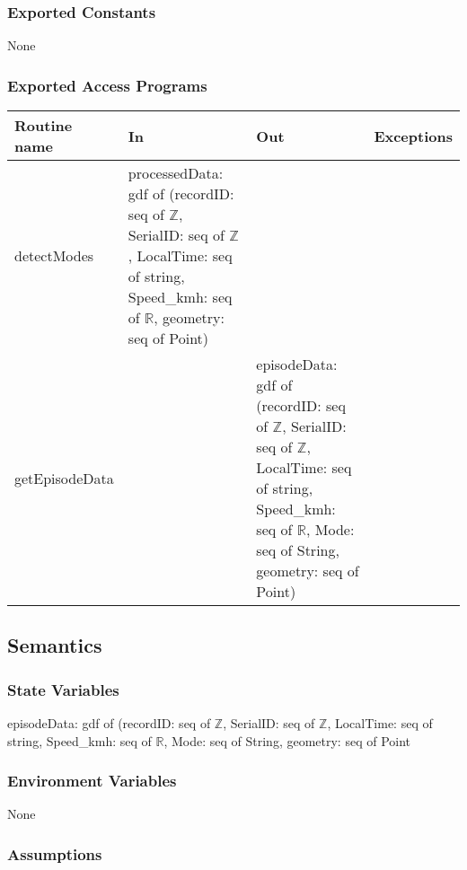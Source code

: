 \documentclass[12pt, titlepage]{article}
\begin{document}
\subsubsection{Exported Constants}

None

\subsubsection{Exported Access Programs}

\begin{center}
\begin{tabular}{| l | >{\raggedright}p{4cm} | >{\raggedright}p{4cm} | l |}%
\hline
\textbf{Routine name} & \textbf{In} & \textbf{Out} & \textbf{Exceptions}\\
\hline
detectModes & processedData: gdf of (recordID: seq of $\mathbb{Z}$, SerialID: seq of $\mathbb{Z}$, LocalTime: seq of string, Speed\_kmh: seq of $\mathbb{R}$, geometry: seq of Point) & & \\
\hline
getEpisodeData & & episodeData: gdf of (recordID: seq of $\mathbb{Z}$, SerialID: seq of $\mathbb{Z}$, LocalTime: seq of string, Speed\_kmh: seq of $\mathbb{R}$, Mode: seq of String, geometry: seq of Point) & \\
\hline

\end{tabular}
\end{center}

\subsection{Semantics}

\subsubsection{State Variables}

episodeData: gdf of (recordID: seq of $\mathbb{Z}$, SerialID: seq of $\mathbb{Z}$, LocalTime: seq of string, Speed\_kmh: seq of $\mathbb{R}$, Mode: seq of String, geometry: seq of Point

\subsubsection{Environment Variables}

None

\subsubsection{Assumptions}
\end{document}

